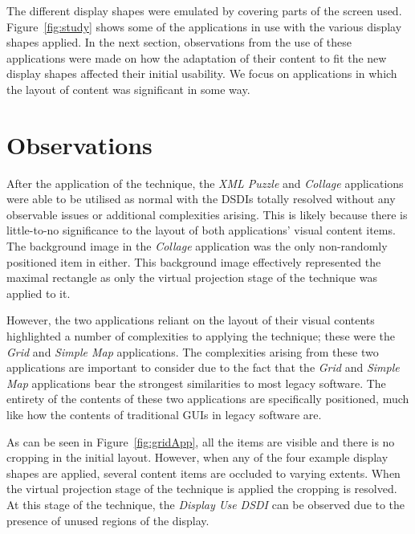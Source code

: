 \documentclass{bmcart}
\begin{document}
The different display shapes were emulated by covering parts of the screen used.
Figure~\ref{fig:study} shows some of the applications in use with the various display shapes applied.
In the next section, observations from the use of these applications were made on how the adaptation of their content to fit the new display shapes affected their initial usability.
We focus on applications in which the layout of content was significant in some way.

\section*{Observations}
\label{sec:observations}


After the application of the technique, the {\emph{XML Puzzle}} and {\emph{Collage}} applications were able to be utilised as normal with the \acp{DSDI} totally resolved without any observable issues or additional complexities arising.
This is likely because there is little-to-no significance to the layout of both applications' visual content items.
The background image in the {\emph{Collage}} application was the only non-randomly positioned item in either.
This background image effectively represented the maximal rectangle as only the virtual projection stage of the technique was applied to it.

However, the two applications reliant on the layout of their visual
contents highlighted a number of complexities to applying the technique; these were the {\emph{Grid}} and {\emph{Simple Map}} applications.
The complexities arising from these two applications are important to consider due to the fact that the {\emph{Grid}} and {\emph{Simple Map}} applications bear the strongest similarities to most legacy software.
The entirety of the contents of these two applications are specifically positioned, much like how the contents of traditional GUIs in legacy software are.


As can be seen in Figure~\ref{fig:gridApp}, all the items are visible and there is no cropping in the initial layout.
However, when any of the four example display shapes are applied, several content items are occluded to varying extents.
When the virtual projection stage of the technique is applied the cropping is resolved.
At this stage of the technique, the {\emph{Display Use \ac{DSDI}}} can be observed due to the presence of unused regions of the display.
\end{document}
